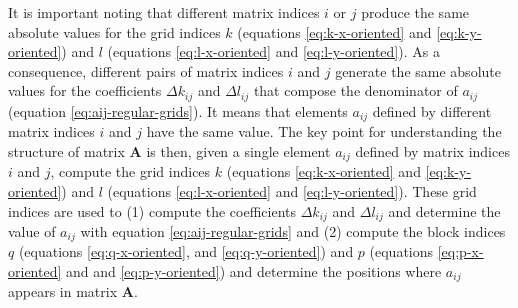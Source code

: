 \documentclass[manuscript,revised]{geophysics}
\begin{document}
It is important noting that different matrix indices $i$ or $j$ produce the same 
absolute values for the grid indices $k$ (equations \ref{eq:k-x-oriented} and
\ref{eq:k-y-oriented}) and $l$ (equations \ref{eq:l-x-oriented} and
\ref{eq:l-y-oriented}). As a consequence, different pairs of matrix indices $i$
and $j$ generate the same absolute values for the coefficients $\Delta k_{ij}$ and
$\Delta l_{ij}$ that compose the denominator of $a_{ij}$ 
(equation \ref{eq:aij-regular-grids}). It means that elements $a_{ij}$ defined
by different matrix indices $i$ and $j$ have the same value. The key point for
understanding the structure of matrix $\mathbf{A}$ is then, given a single element $a_{ij}$
defined by matrix indices $i$ and $j$, compute the grid indices 
$k$ (equations \ref{eq:k-x-oriented} and \ref{eq:k-y-oriented}) and
$l$ (equations \ref{eq:l-x-oriented} and \ref{eq:l-y-oriented}).
These grid indices are used to 
(1) compute the coefficients $\Delta k_{ij}$ and 
$\Delta l_{ij}$ and determine the value of $a_{ij}$ with equation 
\ref{eq:aij-regular-grids} and 
(2) compute the block indices $q$ (equations \ref{eq:q-x-oriented}, 
and \ref{eq:q-y-oriented}) and $p$ (equations \ref{eq:p-x-oriented} and
and \ref{eq:p-y-oriented}) and determine the positions where $a_{ij}$ appears
in matrix $\mathbf{A}$.
\end{document}
